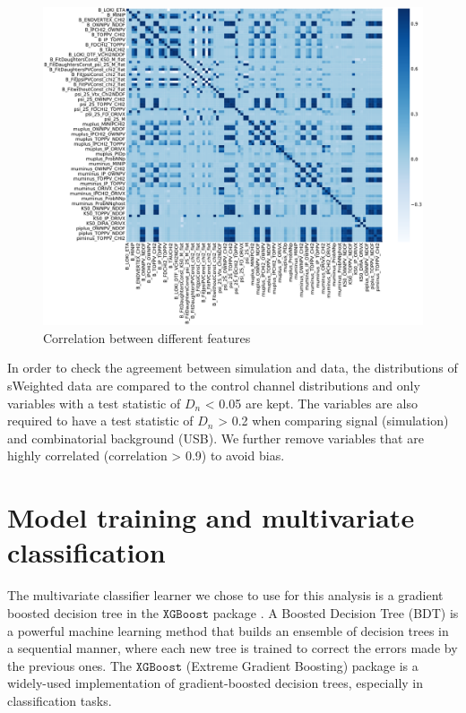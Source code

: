 \newpage
\begin{figure}[H]
    \centering
    \includegraphics[width=0.95\linewidth]{graphs/corr_big.pdf}
    \caption{Correlation between different features}
    \label{fig:corr}
\end{figure}

In order to check the agreement between simulation and data, the distributions of sWeighted data are compared to the control channel distributions and only variables with a test statistic of $D_n$ < 0.05 are kept. The variables are also required to have a test statistic of $D_n$ > 0.2 when comparing signal (simulation) and combinatorial background (USB). We further
remove variables that are highly correlated (correlation > 0.9) to avoid bias.

\section{Model training and multivariate classification}

The multivariate classifier learner we chose to use for this analysis is a gradient boosted decision tree in the $\texttt{XGBoost}$ package \cite{Chen}. A Boosted Decision Tree (BDT) is a powerful machine learning method that builds an ensemble of decision trees in a sequential manner, where each new tree is trained to correct the errors made by the previous ones. The $\texttt{XGBoost}$ (Extreme Gradient Boosting) package is a widely-used implementation of gradient-boosted decision trees, especially in classification tasks.

